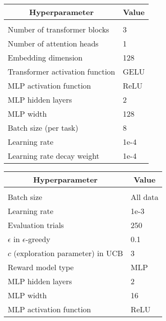 \documentclass{article} %
\begin{document}
\begin{table*}[h]
\begin{minipage}{0.48\linewidth}
    \begin{center}
        \begin{tabular}{ll}
            \multicolumn{1}{c}{Hyperparameter}  & \multicolumn{1}{c}{Value} \\
            \hline \\
            Number of transformer blocks & 3\\
            Number of attention heads & 1 \\
            Embedding dimension & 128 \\
            Transformer activation function & GELU \\
            MLP activation function & ReLU \\
            MLP hidden layers & 2 \\
            MLP width & 128 \\
            Batch size (per task) & 8\\
            Learning rate & 1e-4\\
            Learning rate decay weight & 1e-4\\
        \end{tabular}
    \end{center}
    \caption{Hyperparameter values for PDT and DT models.}
    \label{tab:dt_hyperparameters}
\end{minipage}%
\hfill
\begin{minipage}{0.48\linewidth}
    \begin{center}
        \begin{tabular}{ll}
            \multicolumn{1}{c}{Hyperparameter}  & \multicolumn{1}{c}{Value} \\
            \hline \\
            Batch size & All data\\
            Learning rate & 1e-3\\
            Evaluation trials & 250\\
            $\epsilon$ in $\epsilon$-greedy & 0.1\\
            $c$ (exploration parameter) in UCB & 3\\
            Reward model type & MLP \\
            MLP hidden layers & 2 \\
            MLP width & 16 \\
            MLP activation function & ReLU \\
        \end{tabular}
    \end{center}
    \caption{Hyperparameters of Contextual Multi-armed Bandit}
    \label{tab:cmab_hyperparameters}
\end{minipage}
\end{table*}
\end{document}
